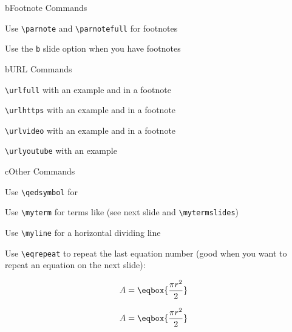 \begin{myslidefragile}{b}{Footnote Commands}

Use \lstinline{\parnote} and \lstinline{\parnotefull} for footnotes

Use the \lstinline{b} slide option when you have footnotes

\end{myslidefragile}

\begin{myslidefragile}{b}{URL Commands}

\lstinline{\urlfull} with an example  and in a footnote

\lstinline{\urlhttps} with an example  and in a footnote

\lstinline{\urlvideo} with an example  and in a footnote

\lstinline{\urlyoutube} with an example 

\end{myslidefragile}

\begin{myslidefragile}{c}{Other Commands}

Use \lstinline{\qedsymbol} for \qedsymbol

Use \lstinline{\myterm} for terms like  (see next slide and \lstinline{\mytermslides})

Use \lstinline{\myline} for a horizontal dividing line


Use \lstinline{\eqrepeat} to repeat the last equation number (good when you want to repeat an equation on the next slide):

\begin{align}
A & = \eqbox{\frac{\pi r^2}{2}}
\end{align}

\eqrepeat

\begin{align}
A & = \eqbox{\frac{\pi r^2}{2}}
\end{align}

\end{myslidefragile}

